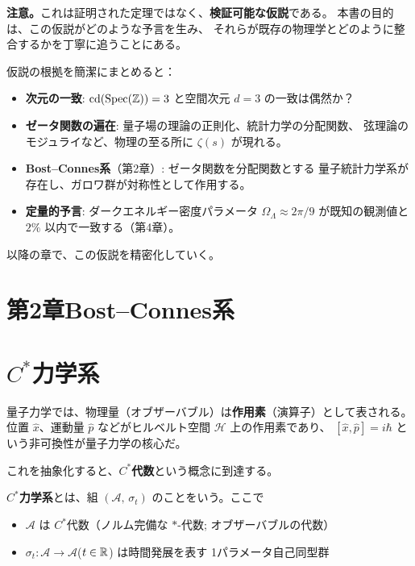 \noindent\textbf{注意。}これは証明された定理ではなく、\textbf{検証可能な仮説}である。
本書の目的は、この仮説がどのような予言を生み、
それらが既存の物理学とどのように整合するかを丁寧に追うことにある。

仮説の根拠を簡潔にまとめると：
\begin{itemize}
  \item \textbf{次元の一致}: $\operatorname{cd}(\operatorname{Spec}(\mathbb{Z}))=3$ と空間次元 $d=3$ の一致は偶然か？
  \item \textbf{ゼータ関数の遍在}: 量子場の理論の正則化、統計力学の分配関数、
        弦理論のモジュライなど、物理の至る所に $\zeta(s)$ が現れる。
  \item \textbf{Bost--Connes系}（第2章）: ゼータ関数を分配関数とする
        量子統計力学系が存在し、ガロワ群が対称性として作用する。
  \item \textbf{定量的予言}: ダークエネルギー密度パラメータ $\Omega_\Lambda \approx 2\pi/9$
        が既知の観測値と $2\%$ 以内で一致する（第4章）。
\end{itemize}

以降の章で、この仮説を精密化していく。

\section*{第2章\quad Bost--Connes系}

\section{$C^*$力学系}
\label{sec:2.1}

量子力学では、物理量（オブザーバブル）は\textbf{作用素}（演算子）として表される。
位置 $\hat{x}$、運動量 $\hat{p}$ などがヒルベルト空間 $\mathcal{H}$ 上の作用素であり、
$[\hat{x}, \hat{p}] = i\hbar$ という非可換性が量子力学の核心だ。

これを抽象化すると、$C^*$\textbf{代数}という概念に到達する。

\begin{dfnbox}[定義: $C^*$力学系]
$C^*$\textbf{力学系}とは、組 $(\mathcal{A},\, \sigma_t)$ のことをいう。ここで
\begin{itemize}
  \item $\mathcal{A}$ は $C^*$代数（ノルム完備な $*$-代数; オブザーバブルの代数）
  \item $\sigma_t: \mathcal{A}\to\mathcal{A}$\;($t\in\mathbb{R}$) は時間発展を表す
        1パラメータ自己同型群
\end{itemize}
\end{dfnbox}

